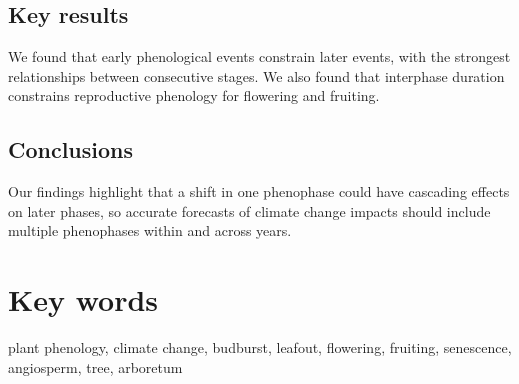 \documentclass{article}
\begin{document}
\subsection*{Key results}
We found that early phenological events constrain later events, with the strongest relationships between consecutive stages. We also found that interphase duration constrains reproductive phenology for flowering and fruiting.
\subsection*{Conclusions}
Our findings highlight that a shift in one phenophase could have cascading effects on later phases, so accurate forecasts of climate change impacts should include multiple phenophases within and across years. 

\section* {Key words}
plant phenology, climate change, budburst, leafout, flowering, fruiting, senescence, angiosperm, tree, arboretum
\end{document}
